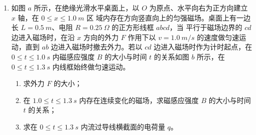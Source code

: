 \begin{enumerate}

\newpage
\item
如图 $ a $ 所示，在绝缘光滑水平桌面上，以 $ O $ 为原点、水平向右为正方向建立 $ x $ 轴，在 $ 0 \leq x \leq 1.0 \ m $ 区
域内存在方向竖直向上的匀强磁场。桌面上有一边长 $ L=0.5 \ m $、电阻 $ R=0.25 \ \Omega $ 的正方形线框 $ abcd $，当
平行于磁场边界的 $ cd $ 边进入磁场时，在沿 $ x $ 方向的外力 $ F $ 作用下以 $ v=1.0 \ m/s $ 的速度做匀速运动，直到 $ ab $
边进入磁场时撤去外力。若以 $ cd $ 边进入磁场时作为计时起点，在 $ 0 \leq t \leq 1.0 \ s $ 内磁感应强度 $ B $ 的大小与时间
$ t $ 的关系如图 $ b $ 所示，在 $ 0 \leq t \leq 1.3 \ s $ 内线框始终做匀速运动。
\begin{enumerate}
\item
求外力 $ F $ 的大小；



\item 
在 $ 1.0 \leq t \leq 1.3 \ s $ 内存在连续变化的磁场，求磁感应强度 $ B $ 的大小与时间 $ t $ 的关系；



\item 
求在 $ 0 \leq t \leq 1.3 \ s $ 内流过导线横截面的电荷量 $ q $。
\end{enumerate}
\begin{figure}[h!]
\flushright
\begin{subfigure}{0.44\linewidth}
\centering
 
\caption{}\label{}
\end{subfigure}
\hfil
\begin{subfigure}{0.5\linewidth}
\centering
 
\caption{}\label{}
\end{subfigure}
\end{figure}




\end{enumerate}
